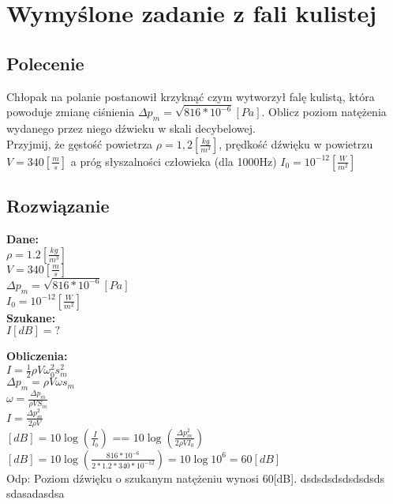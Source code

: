 \documentclass[a4paper,14pt]{extarticle}  %
\begin{document}
    \section{Wymyślone zadanie z fali kulistej}
        \subsection{Polecenie}
        Chłopak na polanie postanowił krzyknąć czym wytworzył falę kulistą, która powoduje zmianę ciśnienia $\Delta p_m = \sqrt{816*10^{-6}}[Pa]$.
        Oblicz poziom natężenia wydanego przez niego dźwieku w skali decybelowej.\\
        Przyjmij, że gęstość powietrza $\rho = 1,2 [\frac{kg}{m^3}]$, prędkość dźwięku w powietrzu $V = 340 [\frac{m}{s}]$ a próg słyszalności człowieka (dla 1000Hz) $I_0 = 10^{-12}[\frac{W}{m^2}]$\\
        \subsection{Rozwiązanie}
        \textbf{Dane:}\\
        
     $\rho = 1.2[\frac{kg}{m^3}]$\\
     $V = 340[\frac{m}{s}]$\\
     $\Delta p_m = \sqrt{816*10^{-6}}[Pa]$\\
     $I_0 = 10^{-12}[\frac{W}{m^2}]$\\
            
        
    
   \textbf{Szukane:}\\ 
     $I[dB] = ?$
    
    
    \textbf{Obliczenia:}\\
    $I = \frac{1}{2}\rho V\omega_0^2 s_m^2 $\\
    $\Delta p_m = \rho V \omega s_m$\\
    $\omega = \frac{\Delta p_m}{\rho VS_m}$\\
    $I = \frac{\Delta p_m^2}{2\rho V}$\\
    $[dB] = 10\log(\frac{I}{I_0})$  ==  $10\log(\frac{\Delta p_m^2}{2\rho VI_0})$\\
    $[dB] = 10\log(\frac{816*10^{-6}}{2*1.2*340*10^{-12}}) = 10\log10^6 = 60[dB]$\\
    Odp: Poziom dźwięku o szukanym natężeniu wynosi 60[dB].
    dsdsdsdsdsdsdsds
    sdasadasdsa

    
\end{document}
